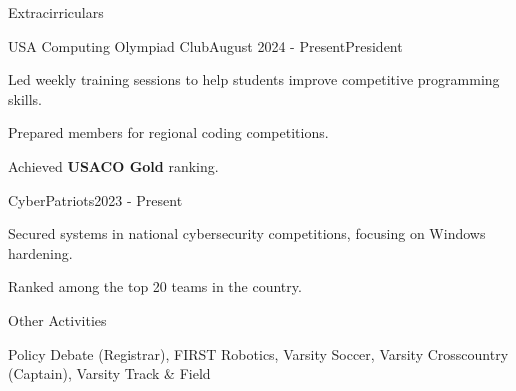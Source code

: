 \documentclass[
	11pt, %
]{resume} %
\begin{document}
\begin{rSection}{Extracirriculars}

	\begin{rSubsection}{USA Computing Olympiad Club}{August 2024 - Present}{President}{}
		\item Led weekly training sessions to help students improve competitive programming skills.
		\item Prepared members for regional coding competitions.
		\item Achieved \textbf{USACO Gold} ranking.
	\end{rSubsection}


	\begin{rSubsection}{CyberPatriots}{2023 - Present}{}{}
		\item Secured systems in national cybersecurity competitions, focusing on Windows hardening.
		\item Ranked among the top 20 teams in the country.
	\end{rSubsection}


	\begin{rSubsection}{Other Activities}{}{}{}
		\item Policy Debate (Registrar), FIRST Robotics, Varsity Soccer, Varsity Crosscountry (Captain), Varsity Track \& Field
	\end{rSubsection}

\end{rSection}







\end{document}
